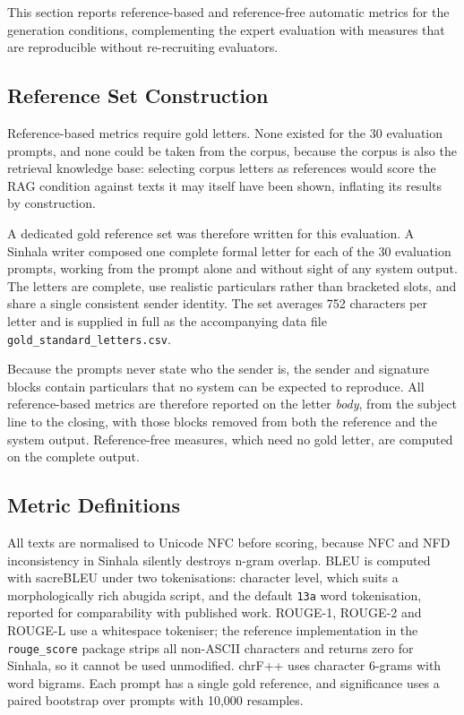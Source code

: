 \documentclass[12pt]{uomthesis}
\begin{document}
This section reports reference-based and reference-free automatic metrics for the generation conditions, complementing the expert evaluation with measures that are reproducible without re-recruiting evaluators.

\subsection{Reference Set Construction}

Reference-based metrics require gold letters. None existed for the 30 evaluation prompts, and none could be taken from the corpus, because the corpus is also the retrieval knowledge base: selecting corpus letters as references would score the RAG condition against texts it may itself have been shown, inflating its results by construction.

A dedicated gold reference set was therefore written for this evaluation. A Sinhala writer composed one complete formal letter for each of the 30 evaluation prompts, working from the prompt alone and without sight of any system output. The letters are complete, use realistic particulars rather than bracketed slots, and share a single consistent sender identity. The set averages 752 characters per letter and is supplied in full as the accompanying data file \texttt{gold\_standard\_letters.csv}.

Because the prompts never state who the sender is, the sender and signature blocks contain particulars that no system can be expected to reproduce. All reference-based metrics are therefore reported on the letter \emph{body}, from the subject line to the closing, with those blocks removed from both the reference and the system output. Reference-free measures, which need no gold letter, are computed on the complete output.

\subsection{Metric Definitions}

All texts are normalised to Unicode NFC before scoring, because NFC and NFD inconsistency in Sinhala silently destroys n-gram overlap. BLEU is computed with sacreBLEU under two tokenisations: character level, which suits a morphologically rich abugida script, and the default \texttt{13a} word tokenisation, reported for comparability with published work. ROUGE-1, ROUGE-2 and ROUGE-L use a whitespace tokeniser; the reference implementation in the \texttt{rouge\_score} package strips all non-ASCII characters and returns zero for Sinhala, so it cannot be used unmodified. chrF++ uses character 6-grams with word bigrams. Each prompt has a single gold reference, and significance uses a paired bootstrap over prompts with 10{,}000 resamples.
\end{document}
